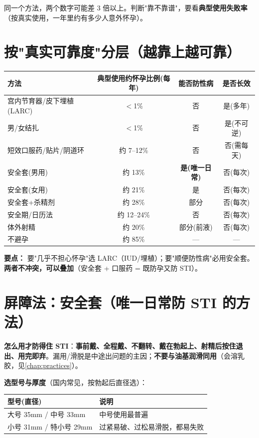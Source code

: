 \documentclass[12pt,UTF8,openany]{ctexbook}
\begin{document}
\noindent 同一个方法，两个数字可能差 3 倍以上。判断"靠不靠谱"，要看\textbf{典型使用失败率}（按真实使用，一年里约有多少人意外怀孕）。

\section{按"真实可靠度"分层（越靠上越可靠）}

\begin{tabularx}{\textwidth}{p{3.4cm}CCC}
\toprule
方法 & 典型使用约怀孕比例(每年) & 能否防性病 & 是否长效 \\
\midrule
宫内节育器/皮下埋植(LARC) & $<$1\% & 否 & 是(多年) \\
男/女结扎 & $<$1\% & 否 & 是(不可逆) \\
短效口服药/贴片/阴道环 & 约 7--12\% & 否 & 否(需每天) \\
安全套(男用) & 约 13\% & \textbf{是(唯一日常)} & 否(每次) \\
安全套(女用) & 约 21\% & 是 & 否(每次) \\
安全套+杀精剂 & 约 28\% & 部分 & 否(每次) \\
安全期/日历法 & 约 12--24\% & 否 & 否(每次) \\
体外射精 & 约 20\% & 部分(前液) & 否(每次) \\
不避孕 & 约 85\% & — & — \\
\bottomrule
\end{tabularx}

\vspace{0.5em}
\noindent\textbf{要点：} 要"几乎不担心怀孕"选 LARC（IUD/埋植）；要"顺便防性病"必用安全套。\textbf{两者不冲突，可以叠加}（安全套 + 口服药 = 既防孕又防 STI）。

\section{屏障法：安全套（唯一日常防 STI 的方法）}

\noindent\textbf{怎么用才防得住 STI}：\textbf{事前戴、全程戴、不翻转、戴在勃起上、射精后按住退出、用完即弃}。漏用/滑脱是中途出问题的主因；\textbf{不要与油基润滑同用}（会溶乳胶，见\ref{chap:practices}）。

\noindent\textbf{选型号与厚度}（国内常见，按勃起后直径选）：

\begin{tabularx}{\textwidth}{lX}
\toprule
型号(直径) & 说明 \\
\midrule
大号 35mm / 中号 33mm & 中号使用最普遍 \\
小号 31mm / 特小号 29mm & 过紧易破、过松易滑脱，都易失败 \\
\bottomrule
\end{tabularx}
\end{document}
